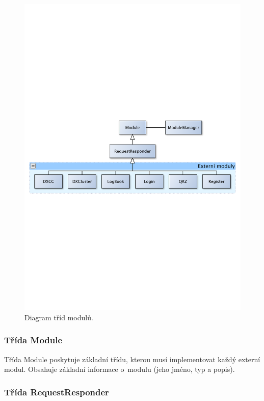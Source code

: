 \begin{figure}[h]
\centering
\includegraphics[trim=10cm 10cm 10cm 10cm, scale=0.7]{fig/moduly}
\caption{Diagram tříd modulů.}
\label{fig:moduly}
\end{figure}

\subsubsection{Třída Module}

Třída Module poskytuje základní třídu, kterou musí implementovat každý externí modul. Obsahuje základní informace o~modulu 
(jeho jméno, typ a popis).

\subsubsection{Třída RequestResponder}

